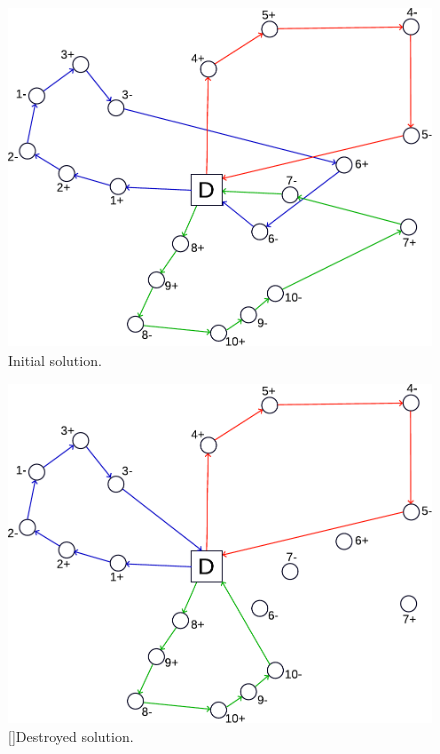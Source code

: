 \documentclass[aspectratio=1610]{beamer}
\begin{document}
\begin{frame}
\begin{minipage}[t]{0.3\linewidth}
\begin{figure}
	\includegraphics[width=\textwidth]{graphics/lns-initial-solution-new}
	\caption{Initial solution.}
\end{figure}
\end{minipage}%
\hfill%
\begin{minipage}[t]{.3\textwidth}
\begin{figure}
	\centering
	\includegraphics[width=\textwidth]{graphics/lns-destroy-solution-new} 
	[]{Destroyed solution.}
\end{figure}
\end{minipage}%
\hfill%
\begin{minipage}[t]{.3\textwidth}

\end{minipage}
\end{frame}
\end{document}
